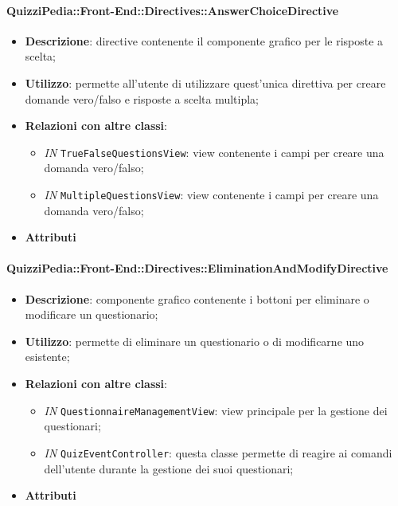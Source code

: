 \paragraph{QuizziPedia::Front-End::Directives::AnswerChoiceDirective}
\begin{itemize}
	\item \textbf{Descrizione}: directive contenente il componente grafico per le risposte a scelta;
	\item \textbf{Utilizzo}: permette all'utente di utilizzare quest'unica direttiva per creare domande vero/falso e risposte a scelta multipla;
	\item \textbf{Relazioni con altre classi}:
	\begin{itemize}
		\item \textit{IN} \texttt{TrueFalseQuestionsView}: view contenente i campi per creare una domanda vero/falso; 
		\item \textit{IN} \texttt{MultipleQuestionsView}:  view contenente i campi per creare una domanda vero/falso; 
	\end{itemize}
	\item \textbf{Attributi}
\end{itemize}

\paragraph{QuizziPedia::Front-End::Directives::EliminationAndModifyDirective}
\begin{itemize}
	\item \textbf{Descrizione}: componente grafico contenente i bottoni per eliminare o modificare un questionario;
	\item \textbf{Utilizzo}: permette di eliminare un questionario o di modificarne uno esistente;
	\item \textbf{Relazioni con altre classi}:
	\begin{itemize}
		\item \textit{IN} \texttt{QuestionnaireManagementView}: view principale per la gestione dei questionari; 
		\item \textit{IN} \texttt{QuizEventController}: questa classe permette di reagire ai comandi dell'utente durante la gestione dei suoi questionari;
	\end{itemize}
	\item \textbf{Attributi}
\end{itemize}

